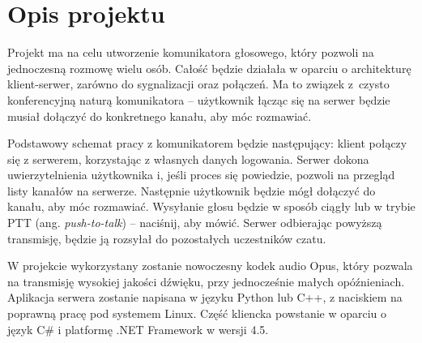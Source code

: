 \section{Opis projektu}
Projekt ma na celu utworzenie komunikatora głosowego, który pozwoli na jednoczesną rozmowę wielu osób. Całość będzie działała w oparciu o architekturę klient-serwer, zarówno do sygnalizacji oraz połączeń. Ma to związek z~czysto konferencyjną naturą komunikatora -- użytkownik łącząc się na serwer będzie musiał dołączyć do konkretnego kanału, aby móc rozmawiać.

Podstawowy schemat pracy z komunikatorem będzie następujący: klient połączy się z serwerem, korzystając z własnych danych logowania. Serwer dokona uwierzytelnienia użytkownika i, jeśli proces się powiedzie, pozwoli na przegląd listy kanałów na serwerze. Następnie użytkownik będzie mógł dołączyć do kanału, aby móc rozmawiać. Wysyłanie głosu będzie w sposób ciągły lub w trybie PTT (ang. \textit{push-to-talk}) -- naciśnij, aby mówić. Serwer odbierając powyższą transmisję, będzie ją rozsyłał do pozostałych uczestników czatu.

W projekcie wykorzystany zostanie nowoczesny kodek audio Opus, który pozwala na transmisję wysokiej jakości dźwięku, przy jednocześnie małych opóźnieniach. Aplikacja serwera zostanie napisana w języku Python lub C++, z naciskiem na poprawną pracę pod systemem Linux. Część kliencka powstanie w oparciu o język C\# i platformę .NET Framework w wersji 4.5.
